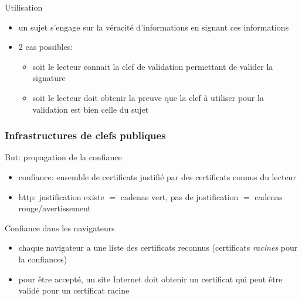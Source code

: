 \begin{reveals}
\begin{frame}
  \vfill



   \begin{block}{Utilisation}
     \begin{itemize}
     \item un sujet s'engage sur la véracité d'informations en signant
       ces informations
     \item 2 cas possibles:
       \begin{itemize}
       \item soit le lecteur connait la clef de validation permettant
         de valider la signature
       \item soit le lecteur doit obtenir la preuve que la clef à
         utiliser pour la validation est bien celle du sujet
       \end{itemize}
     \end{itemize}
  \end{block}

  \vfill


\end{frame}

\begin{frame}
  \frametitle{Infrastructures de clefs publiques}

  \vfill

  \begin{block}{But: propagation de la confiance}
    \begin{itemize}
    \item confiance: ensemble de certificats justifié par des certificats connus du lecteur
    \item http: justification existe \(=\) cadenas vert, pas de justification
      \(=\) cadenas rouge/avertissement
    \end{itemize}
  \end{block}

  \vfill

  \begin{block}{Confiance dans les navigateurs}
    \begin{itemize}
    \item chaque navigateur a une liste des certificats reconnus
      (certificats \emph{racines} pour la confiances)
    \item pour être accepté, un site Internet doit obtenir un
      certificat qui peut être validé pour un certificat racine
    \end{itemize}
  \end{block}


\end{frame}
\end{reveals}
